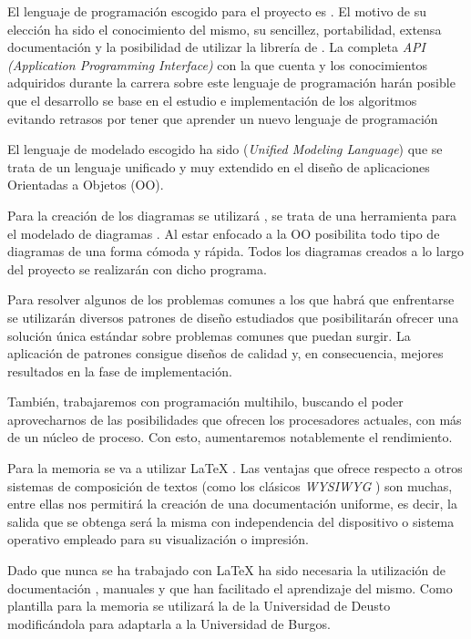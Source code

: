 El lenguaje de programación escogido para el proyecto es \javaversion{}. El motivo de su elección ha sido el conocimiento del mismo, su sencillez, portabilidad, extensa documentación y la posibilidad de utilizar la librería de \weka{}. La completa \textit{API (Application Programming Interface)} con la que cuenta y los conocimientos adquiridos durante la carrera sobre este lenguaje de programación harán posible que el desarrollo se base en el estudio e implementación de los algoritmos evitando retrasos por tener que aprender un nuevo lenguaje de programación

El lenguaje de modelado escogido ha sido \uml{} (\textit{Unified Modeling Language}) que se trata de un lenguaje unificado y muy extendido en el diseño de aplicaciones Orientadas a Objetos (OO).

Para la creación de los diagramas se utilizará \jude{}, se trata de una herramienta para el modelado de diagramas \uml{}. Al estar enfocado a la OO posibilita todo tipo de diagramas de una forma cómoda y rápida. Todos los diagramas creados a lo largo del proyecto se realizarán con dicho programa.

Para resolver algunos de los problemas comunes a los que habrá que enfrentarse se utilizarán diversos patrones de diseño \cite{patrones} estudiados que posibilitarán ofrecer una solución única estándar sobre problemas comunes que puedan surgir. La aplicación de patrones consigue diseños de calidad y, en consecuencia, mejores resultados en la fase de implementación.

También, trabajaremos con programación multihilo, buscando el poder aprovecharnos de las posibilidades que ofrecen los procesadores actuales, con más de un núcleo de proceso. Con esto, aumentaremos notablemente el rendimiento.

Para la memoria se va a utilizar \LaTeX{} . Las ventajas que ofrece respecto a otros sistemas de composición de textos (como los clásicos \textit{WYSIWYG} ) son muchas, entre ellas nos permitirá la creación de una documentación uniforme, es decir, la salida que se obtenga será la misma con independencia del dispositivo o sistema operativo empleado para su visualización o impresión.

Dado que nunca se ha trabajado con \LaTeX{} ha sido necesaria la utilización de documentación , manuales  y  que han facilitado el aprendizaje del mismo. Como plantilla para la memoria se utilizará la de la Universidad de Deusto  modificándola para adaptarla a la Universidad de Burgos.

